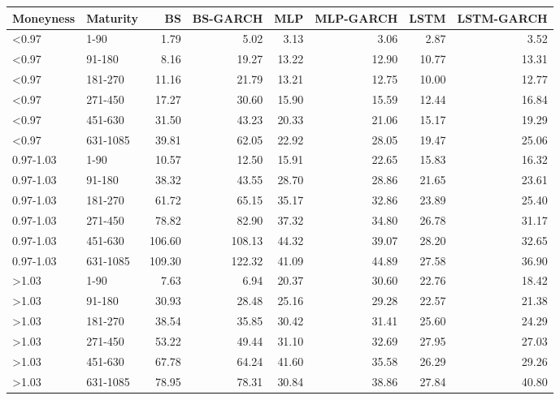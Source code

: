 \begin{tabular}{llrrrrrr}
\toprule
Moneyness & Maturity & BS & BS-GARCH & MLP & MLP-GARCH & LSTM & LSTM-GARCH \\
\midrule
<0.97 & 1-90 & 1.79 & 5.02 & 3.13 & 3.06 & 2.87 & 3.52 \\
<0.97 & 91-180 & 8.16 & 19.27 & 13.22 & 12.90 & 10.77 & 13.31 \\
<0.97 & 181-270 & 11.16 & 21.79 & 13.21 & 12.75 & 10.00 & 12.77 \\
<0.97 & 271-450 & 17.27 & 30.60 & 15.90 & 15.59 & 12.44 & 16.84 \\
<0.97 & 451-630 & 31.50 & 43.23 & 20.33 & 21.06 & 15.17 & 19.29 \\
<0.97 & 631-1085 & 39.81 & 62.05 & 22.92 & 28.05 & 19.47 & 25.06 \\
0.97-1.03 & 1-90 & 10.57 & 12.50 & 15.91 & 22.65 & 15.83 & 16.32 \\
0.97-1.03 & 91-180 & 38.32 & 43.55 & 28.70 & 28.86 & 21.65 & 23.61 \\
0.97-1.03 & 181-270 & 61.72 & 65.15 & 35.17 & 32.86 & 23.89 & 25.40 \\
0.97-1.03 & 271-450 & 78.82 & 82.90 & 37.32 & 34.80 & 26.78 & 31.17 \\
0.97-1.03 & 451-630 & 106.60 & 108.13 & 44.32 & 39.07 & 28.20 & 32.65 \\
0.97-1.03 & 631-1085 & 109.30 & 122.32 & 41.09 & 44.89 & 27.58 & 36.90 \\
>1.03 & 1-90 & 7.63 & 6.94 & 20.37 & 30.60 & 22.76 & 18.42 \\
>1.03 & 91-180 & 30.93 & 28.48 & 25.16 & 29.28 & 22.57 & 21.38 \\
>1.03 & 181-270 & 38.54 & 35.85 & 30.42 & 31.41 & 25.60 & 24.29 \\
>1.03 & 271-450 & 53.22 & 49.44 & 31.10 & 32.69 & 27.95 & 27.03 \\
>1.03 & 451-630 & 67.78 & 64.24 & 41.60 & 35.58 & 26.29 & 29.26 \\
>1.03 & 631-1085 & 78.95 & 78.31 & 30.84 & 38.86 & 27.84 & 40.80 \\
\bottomrule
\end{tabular}
